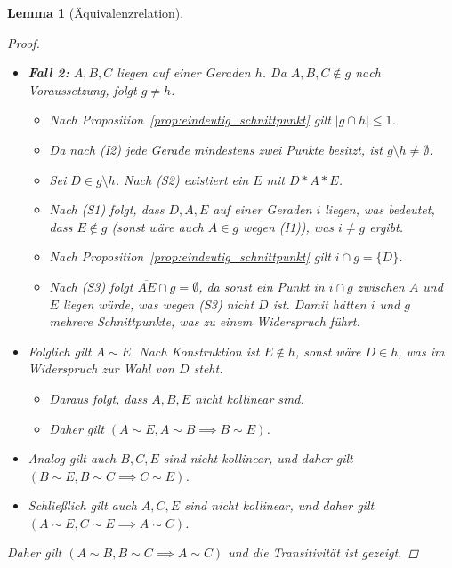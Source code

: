 \documentclass[a4paper,12pt]{article}
\theoremstyle{break}
\newtheorem{lemma}[definition]{Lemma}
\begin{document}
\begin{lemma}[Äquivalenzrelation]
\begin{proof}
\begin{itemize}
    \item \textbf{Fall 2:} \(A, B, C\) liegen auf einer Geraden \(h\). Da \(A, B, C \notin g\) nach Voraussetzung, folgt \(g \neq h\).
    \begin{itemize}
        \item Nach Proposition~\ref{prop:eindeutig_schnittpunkt} gilt \(\lvert g \cap h \rvert \leq 1\).
        \item Da nach (I2) jede Gerade mindestens zwei Punkte besitzt, ist \(g \setminus h \neq \emptyset\).
        \item Sei \(D \in g \setminus h\). Nach (S2) existiert ein \(E\) mit \(D * A * E\).
        \item Nach (S1) folgt, dass \(D, A, E\) auf einer Geraden \(i\) liegen, was bedeutet, dass \(E \notin g\) (sonst wäre auch \(A \in g\) wegen (I1)), was \(i \neq g\) ergibt.
        \item Nach Proposition~\ref{prop:eindeutig_schnittpunkt} gilt \(i \cap g = \{D\}\).
        \item Nach (S3) folgt \(\overline{AE} \cap g = \emptyset\), da sonst ein Punkt in \(i \cap g\) zwischen \(A\) und \(E\) liegen würde, was wegen (S3) nicht \(D\) ist. Damit hätten \(i\) und \(g\) mehrere Schnittpunkte, was zu einem Widerspruch führt.
    \end{itemize}
    \item Folglich gilt \(A \sim E\). Nach Konstruktion ist \(E \notin h\), sonst wäre \(D \in h\), was im Widerspruch zur Wahl von \(D\) steht.
    \begin{itemize}
        \item Daraus folgt, dass \(A, B, E\) nicht kollinear sind.
        \item Daher gilt \((A \sim E, A \sim B \implies B \sim E)\).
    \end{itemize}
    \item Analog gilt auch \(B, C, E\) sind nicht kollinear, und daher gilt \((B \sim E, B \sim C \implies C \sim E)\).
    \item Schließlich gilt auch \(A, C, E\) sind nicht kollinear, und daher gilt \((A \sim E, C \sim E \implies A \sim C)\).
\end{itemize}
Daher gilt \((A \sim B, B \sim C \implies A \sim C)\) und die Transitivität ist gezeigt.
\end{proof}
\begin{center}
\end{center}
\end{lemma}
\end{document}
